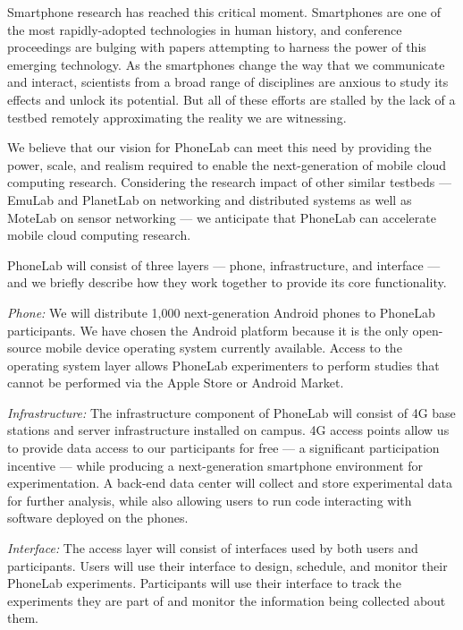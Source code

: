 Smartphone research has reached this critical moment. Smartphones are one of the
most rapidly-adopted technologies in human history, and conference proceedings
are bulging with papers attempting to harness the power of this emerging
technology. As the smartphones change the way that we communicate and interact,
scientists from a broad range of disciplines are anxious to study its effects
and unlock its potential. But all of these efforts are stalled by the lack of
a testbed remotely approximating the reality we are witnessing.


We believe that our vision for PhoneLab can meet this need by providing the
power, scale, and realism required to enable the next-generation of mobile
cloud computing research. Considering the research impact of other similar
testbeds --- EmuLab and PlanetLab on networking and distributed systems as
well as MoteLab on sensor networking --- we anticipate that PhoneLab can
accelerate mobile cloud computing research.

PhoneLab will consist of three layers --- phone, infrastructure, and
interface --- and we briefly describe how they work together to provide its
core functionality.

\emph{Phone:} We will distribute 1,000 next-generation Android
phones to PhoneLab participants. We have chosen the Android platform
because it is the only open-source mobile device operating system
currently available.  Access to the operating system layer allows
PhoneLab experimenters to perform studies that cannot be performed via
the Apple Store or Android Market.

\emph{Infrastructure:} The infrastructure component of
PhoneLab will consist of 4G base stations and server infrastructure installed
on campus. 4G access points allow us to provide data access to our
participants for free --- a significant participation incentive --- while
producing a next-generation smartphone environment for experimentation. A
back-end data center will collect and store experimental data for further
analysis, while also allowing users to run code interacting with software
deployed on the phones.

\emph{Interface:} The access layer will consist of interfaces used
by both users and participants. Users will use their interface to design,
schedule, and monitor their PhoneLab experiments. Participants will use
their interface to track the experiments they are part of and monitor the
information being collected about them.


